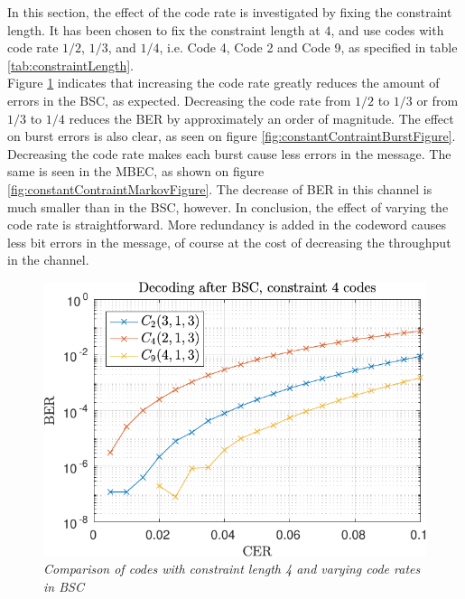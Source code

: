 In this section, the effect of the code rate is investigated by fixing the constraint length. It has been chosen to fix the constraint length at $4$, and use codes with code rate $1/2$, $1/3$, and $1/4$, i.e. Code 4, Code 2 and Code 9, as specified in table \ref{tab:constraintLength}.
\\[6pt]
Figure \ref{fig:constantContraintRandomFigure} indicates that increasing the code rate greatly reduces the amount of errors in the BSC, as expected. Decreasing the code rate from $1/2$ to $1/3$ or from $1/3$ to $1/4$ reduces the BER by approximately an order of magnitude.
The effect on burst errors is also clear, as seen on figure \ref{fig:constantContraintBurstFigure}. Decreasing the code rate makes each burst cause less errors in the message. The same is seen in the MBEC, as shown on figure \ref{fig:constantContraintMarkovFigure}. The decrease of BER in this channel is much smaller than in the BSC, however.
In conclusion, the effect of varying the code rate is straightforward. More redundancy is added in the codeword causes less bit errors in the message, of course at the cost of decreasing the throughput in the channel.





%

\begin{figure}
\centering
\includegraphics[scale=1]{../figures/const4rand.pdf} 
\caption{\textit{Comparison of codes with constraint length 4 and varying code rates in BSC}\label{fig:constantContraintRandomFigure}}
\end{figure}


